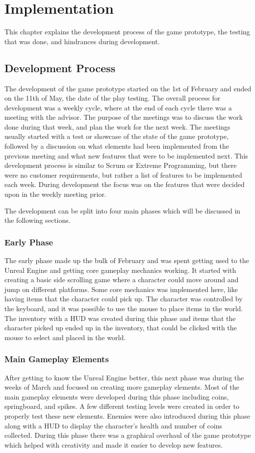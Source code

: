 \chapter{Implementation}
This chapter explains the development process of the game prototype, the testing that was done, and hindrances during development.


\section{Development Process}
\label{sec:evolution}
The development of the game prototype started on the 1st of February and ended on the 11th of May, the date of the play testing. The overall process for development was a weekly cycle, where at the end of each cycle there was a meeting with the advisor. The purpose of the meetings was to discuss the work done during that week, and plan the work for the next week. The meetings usually started with a test or showcase of the state of the game prototype, followed by a discussion on what elements had been implemented from the previous meeting and what new features that were to be implemented next. This development process is similar to Scrum or Extreme Programming, but there were no customer requirements, but rather a list of features to be implemented each week. During development the focus was on the features that were decided upon in the weekly meeting prior.

The development can be split into four main phases which will be discussed in the following sections.

\subsection{Early Phase}
The early phase made up the bulk of February and was spent getting used to the Unreal Engine and getting core gameplay mechanics working. It started with creating a basic side scrolling game where a character could move around and jump on different platforms. Some core mechanics was implemented here, like having items that the character could pick up. The character was controlled by the keyboard, and it was possible to use the mouse to place items in the world. The inventory with a HUD was created during this phase and items that the character picked up ended up in the inventory, that could be clicked with the mouse to select and placed in the world. 

\subsection{Main Gameplay Elements}
After getting to know the Unreal Engine better, this next phase was during the weeks of March and focused on creating more gameplay elements. Most of the main gameplay elements were developed during this phase including coins, springboard, and spikes. A few different testing levels were created in order to properly test these new elements. Enemies were also introduced during this phase along with a HUD to display the character's health and number of coins collected. During this phase there was a graphical overhaul of the game prototype which helped with creativity and made it easier to develop new features.

